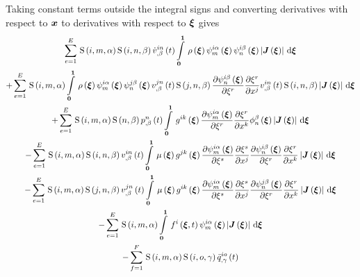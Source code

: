 Taking constant terms outside the integral signs and converting derivatives
with respect to $ \boldsymbol{x} $ to derivatives with respect to $ \boldsymbol{\xi} $ gives
\begin{multline}
  \gsum{e=1}{E}{\idxgsf{i}{m}{\alpha}\idxgsf{i}{n}{\beta}\fnof{\idxnodedof{\dot{v}}{i}{n}{\beta}}{t}
    \gint{\vectr{0}}{\vectr{1}}{\fnof{\rho}{\vectr{\xi}}
      \idxgbfn{i}{m}{\alpha}{\vectr{\xi}}\idxgbfn{i}{n}{\beta}{\vectr{\xi}}
      \abs{\fnof{\matr{J}}{\vectr{\xi}}}}{\vectr{\xi}}}\\
  +\gsum{e=1}{E}{\idxgsf{i}{m}{\alpha}\gint{\vectr{0}}{\vectr{1}}{\fnof{\rho}{\vectr{\xi}}
      \idxgbfn{i}{m}{\alpha}{\vectr{\xi}}\idxgbfn{j}{n}{\beta}{\vectr{\xi}}
      \fnof{\idxnodedof{v}{j}{n}{\beta}}{t}\idxgsf{j}{n}{\beta}\delby{\idxgbfn{i}{n}{\beta}{\vectr{\xi}}}{\xi^{r}}
      \delby{\xi^{r}}{x^{j}}\fnof{\idxnodedof{v}{i}{n}{\beta}}{t}\idxgsf{i}{n}{\beta}
      \abs{\fnof{\matr{J}}{\vectr{\xi}}}}{\vectr{\xi}}}\\
  +\gsum{e=1}{E}{\idxgsf{i}{m}{\alpha}\gsf{n}{\beta}\fnof{\nodedof{p}{n}{\beta}}{t}\gint{\vectr{0}}{\vectr{1}}{
      \fnof{g^{ik}}{\vectr{\xi}}\delby{\idxgbfn{i}{m}{\alpha}{\vectr{\xi}}}{\xi^{r}}\delby{\xi^{r}}{x^{k}}
      \altgbfn{n}{\beta}{\vectr{\xi}}\abs{\fnof{\matr{J}}{\vectr{\xi}}}}{\vectr{\xi}}}\\
  -\gsum{e=1}{E}{\idxgsf{i}{m}{\alpha}\idxgsf{i}{n}{\beta}\fnof{\idxnodedof{v}{i}{n}{\beta}}{t}\gint{\vectr{0}}{\vectr{1}}{
      \fnof{\mu}{\vectr{\xi}}\fnof{g^{jk}}{\vectr{\xi}}\delby{\idxgbfn{i}{m}{\alpha}{\vectr{\xi}}}{\xi^{s}}
      \delby{\xi^{s}}{x^{j}}\delby{\idxgbfn{i}{n}{\beta}{\vectr{\xi}}}{\xi^{r}}\delby{\xi^{r}}{x^{k}}
      \abs{\fnof{\matr{J}}{\vectr{\xi}}}}{\vectr{\xi}}}\\
  -\gsum{e=1}{E}{\idxgsf{i}{m}{\alpha}\idxgsf{j}{n}{\beta}\fnof{\idxnodedof{v}{j}{n}{\beta}}{t}
    \gint{\vectr{0}}{\vectr{1}}{\fnof{\mu}{\vectr{\xi}}\fnof{g^{ik}}{\vectr{\xi}}\delby{\idxgbfn{i}{m}{\alpha}{\vectr{\xi}}}{\xi^{s}}
      \delby{\xi^{s}}{x^{j}}\delby{\idxgbfn{j}{n}{\beta}{\vectr{\xi}}}{\xi^{r}}\delby{\xi^{r}}{x^{k}}
      \abs{\fnof{\matr{J}}{\vectr{\xi}}}}{\vectr{\xi}}} \\
  -\gsum{e=1}{E}{\idxgsf{i}{m}{\alpha}\gint{\vectr{0}}{\vectr{1}}{\fnof{f^{i}}{\vectr{\xi},t}\idxgbfn{i}{m}{\alpha}{\vectr{\xi}}\abs{\fnof{\matr{J}}{\vectr{\xi}}}}{\vectr{\xi}}}\\
  -\gsum{f=1}{F}{\idxgsf{i}{m}{\alpha}\idxgsf{i}{o}{\gamma}\fnof{\idxnodedof{\bar{q}}{i}{o}{\gamma}}{t}
}
\end{multline}
